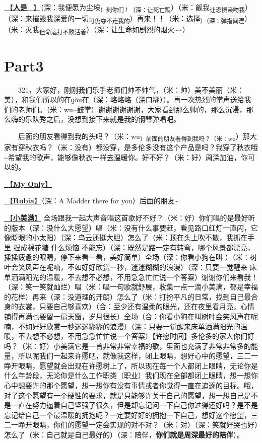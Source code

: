 \documentclass[]{ctexbook}
\begin{document}
\hyperref[renshi]{🎵【\textbf{人是\_}】}（深：我便愿为尘埃\textsubscript{）到你们！（深：让死亡觊}）（米：觎我\textsubscript{让恐惧亲吻我}）（深：来摧毁我深爱的一切\textsubscript{可仍夺不走我的}）再来！！（米：选择\textsubscript{）（深：弹指间湮}）（米：灭我\textsubscript{但命运打不败活着}）（深：让生命如剧烈的烟火\textasciitilde\textasciitilde）

\section{Part3}\label{Toronto-20250315-part3}

  321，大家好，刚刚我们乐手老师们帅不帅气，（米：帅）美不美丽（米：美），和我们所以的在ɡòu在（深：略略略（深口糊））。再一次热烈的掌声送给我们的老师们。（米：wu\textasciitilde 鼓掌）谢谢谢谢谢谢，大家看到那么帅的，那么沉浸，那么嗨的乐队秀之后，没想到接下来就是我的钢琴弹唱吧。

  后面的朋友看得到我的头吗？（米：wu\textsubscript{）前面的朋友看得到我吗？（米：wu}）那大家有穿秋衣吗？（米：没有）都没穿，是多伦多没有这个产品是吗？我穿了秋衣哦\textasciitilde 希望我的歌声，能够像秋衣一样去温暖你。好不好？（米：好）周深加油，你可以的。

\hyperref[my-only]{🎵【\textbf{My Only}】}

\hyperref[rubia]{🎵【\textbf{Rubia}】}（深：A Madder there for you）后面的朋友\textasciitilde{}

\hyperref[happy-ending]{🎵【\textbf{小美满}】} 全场跟我一起大声音唱这首歌好不好？（米：好）你们唱的是最好听的版本（深：没什么大愿望）唱（米：没有什么事要赶，看见路口红灯一直闪，它像眨眼的小太阳）（深：乌云还挺大胆）怎么了（米：顶在头上吹不散，我抓在手里 捏成棉花糖 什么烦恼 不能忘）（深：既然是路一定有转弯，哪个风景都漂亮，揉揉疲惫的眼睛，停下来看一看，美好简单）全场（深：你看小狗在叫 ）（米：树叶会笑风声在呢喃，不如好好欣赏一秒，迷迷糊糊的浪漫）（深：只要一觉醒来 床单洒满阳光的温暖，不去想不必想，不用急急忙忙说一个答案）谢谢你们来看我！（深：笑一笑就灿烂）唱（米：唱一句歌就舒展，收集一点一滴小美满，都是幸福的花样）再来（深：没道理的开朗）怎么了（米：打扮平凡的日常，找到自己最合身的衣裳，只要自己够喜欢）（合：至少还有温柔的眼光，还在夜里看月亮，心情铺得再满也要留一扇天窗，岁月很长）全场（合：你看小狗在叫树叶会笑风声在呢喃，不如好好欣赏一秒迷迷糊糊的浪漫）（深：只要一觉醒来床单洒满阳光的温暖，不去想不必想，不用急急忙忙说一个答案）【许愿时间】多伦多的家人你们好吗？（米：好）小美满它是一首非常非常幸福的歌，里面也充满了非常非常多的能量，所以呢我们一起来许愿吧，就像我这样，闭上眼睛，想好心中的愿望，三二一睁开眼睛，愿望就会出现在许愿树上了，所以现在每一个人都闭上眼睛，无论你是什么年龄段，无论你是什么工作职类（职业）我们现在全部都闭上眼睛，想一想你心中想要许的那个愿望，想一想你有没有事情或者你觉得一直在追逐的目标。哦，对了这个愿望有一个硬性的要求，就是只能够许关于自己的愿望，想一想自己是不是一直在努力逼着自己坚强了很久，但是却忘记问一下自己你过得还好吗？是不是忘记给自己一个最温暖的拥抱呢？一定要好好的拥抱一下自己，想好这个愿望，三二一睁开眼睛，你们的愿望一定会实现的对不对？（米：对）（深：笑就好哭也好）怎么了（米：自己就是自己最好的）（深：陪伴，\textbf{你们就是周深最好的陪伴}）。
\end{document}
